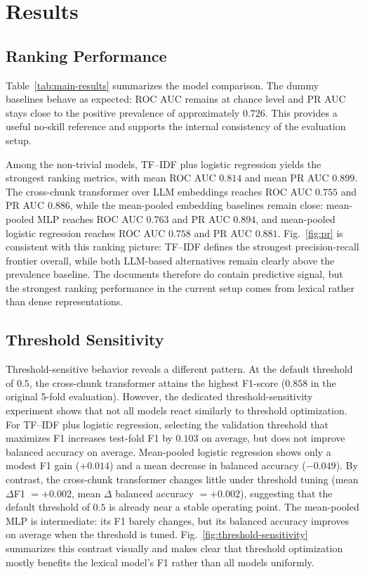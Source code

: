 \documentclass[conference]{IEEEtran}
\begin{document}
\section{Results}
\subsection{Ranking Performance}
Table~\ref{tab:main-results} summarizes the model comparison. The dummy baselines behave as expected: ROC AUC remains at chance level and PR AUC stays close to the positive prevalence of approximately $0.726$. This provides a useful no-skill reference and supports the internal consistency of the evaluation setup.

Among the non-trivial models, TF--IDF plus logistic regression yields the strongest ranking metrics, with mean ROC AUC $0.814$ and mean PR AUC $0.899$. The cross-chunk transformer over LLM embeddings reaches ROC AUC $0.755$ and PR AUC $0.886$, while the mean-pooled embedding baselines remain close: mean-pooled MLP reaches ROC AUC $0.763$ and PR AUC $0.894$, and mean-pooled logistic regression reaches ROC AUC $0.758$ and PR AUC $0.881$. Fig.~\ref{fig:pr} is consistent with this ranking picture: TF--IDF defines the strongest precision-recall frontier overall, while both LLM-based alternatives remain clearly above the prevalence baseline. The documents therefore do contain predictive signal, but the strongest ranking performance in the current setup comes from lexical rather than dense representations.

\subsection{Threshold Sensitivity}
Threshold-sensitive behavior reveals a different pattern. At the default threshold of $0.5$, the cross-chunk transformer attains the highest F1-score ($0.858$ in the original 5-fold evaluation). However, the dedicated threshold-sensitivity experiment shows that not all models react similarly to threshold optimization. For TF--IDF plus logistic regression, selecting the validation threshold that maximizes F1 increases test-fold F1 by $0.103$ on average, but does not improve balanced accuracy on average. Mean-pooled logistic regression shows only a modest F1 gain ($+0.014$) and a mean decrease in balanced accuracy ($-0.049$). By contrast, the cross-chunk transformer changes little under threshold tuning (mean $\Delta$F1 $=+0.002$, mean $\Delta$ balanced accuracy $=+0.002$), suggesting that the default threshold of $0.5$ is already near a stable operating point. The mean-pooled MLP is intermediate: its F1 barely changes, but its balanced accuracy improves on average when the threshold is tuned. Fig.~\ref{fig:threshold-sensitivity} summarizes this contrast visually and makes clear that threshold optimization mostly benefits the lexical model's F1 rather than all models uniformly.
\end{document}
